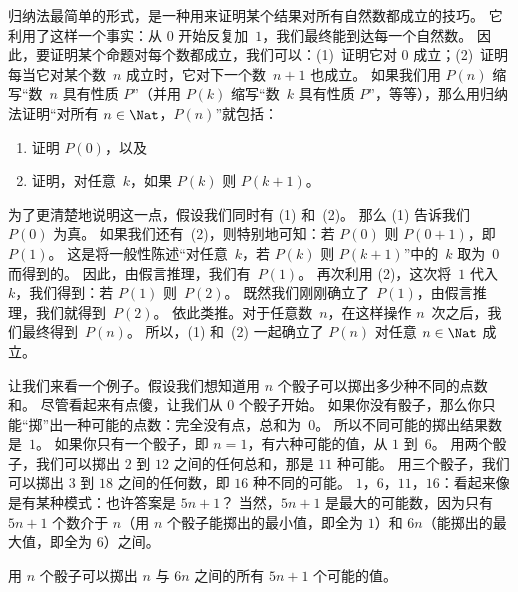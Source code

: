 \documentclass[../../../include/open-logic-section]{subfiles}
\begin{document}


归纳法最简单的形式，是一种用来证明某个结果对所有自然数都成立的技巧。
它利用了这样一个事实：从 $0$ 开始反复加~$1$，我们最终能到达每一个自然数。
因此，要证明某个命题对每个数都成立，我们可以：(1)~证明它对 $0$ 成立；(2)~证明每当它对某个数~$n$ 成立时，它对下一个数~$n+1$ 也成立。
如果我们用 $P(n)$ 缩写“数~$n$ 具有性质 $P$”（并用 $P(k)$ 缩写“数~$k$ 具有性质 $P$”，等等），那么用归纳法证明“对所有 $n \in \Nat$，$P(n)$”就包括：
\begin{enumerate}
\item 证明 $P(0)$，以及
\item 证明，对任意~$k$，如果 $P(k)$ 则 $P(k+1)$。
\end{enumerate}

为了更清楚地说明这一点，假设我们同时有 (1) 和~(2)。
那么 (1) 告诉我们 $P(0)$ 为真。
如果我们还有~(2)，则特别地可知：若 $P(0)$ 则 $P(0+1)$，即 $P(1)$。
这是将一般性陈述“对任意~$k$，若 $P(k)$ 则 $P(k+1)$”中的~$k$ 取为~$0$ 而得到的。
因此，由假言推理，我们有~$P(1)$。
再次利用 (2)，这次将~$1$ 代入~$k$，我们得到：若 $P(1)$ 则~$P(2)$。
既然我们刚刚确立了~$P(1)$，由假言推理，我们就得到~$P(2)$。
依此类推。对于任意数~$n$，在这样操作 $n$~次之后，我们最终得到~$P(n)$。
所以，(1) 和~(2) 一起确立了 $P(n)$ 对任意 $n \in \Nat$ 成立。

让我们来看一个例子。假设我们想知道用 $n$ 个骰子可以掷出多少种不同的点数和。
尽管看起来有点傻，让我们从 $0$ 个骰子开始。
如果你没有骰子，那么你只能“掷”出一种可能的点数：完全没有点，总和为~$0$。
所以不同可能的掷出结果数是~$1$。
如果你只有一个骰子，即 $n=1$，有六种可能的值，从 $1$ 到~$6$。
用两个骰子，我们可以掷出 $2$ 到 $12$ 之间的任何总和，那是 $11$ 种可能。
用三个骰子，我们可以掷出 $3$ 到 $18$ 之间的任何数，即 $16$ 种不同的可能。
$1$，$6$，$11$，$16$：看起来像是有某种模式：也许答案是 $5n+1$？
当然，$5n+1$ 是最大的可能数，因为只有 $5n+1$ 个数介于 $n$（用 $n$ 个骰子能掷出的最小值，即全为 $1$）和 $6n$（能掷出的最大值，即全为 $6$）之间。

\begin{thm}
  用 $n$ 个骰子可以掷出 $n$ 与 $6n$ 之间的所有 $5n+1$ 个可能的值。
\end{thm}
\end{document}
